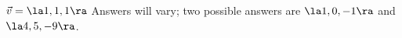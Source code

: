 {$\vec v = \la 1,1,1\ra$
}
{Answers will vary; two possible answers are $\la 1,0,-1\ra$ and $\la 4,5,-9\ra$.
}

